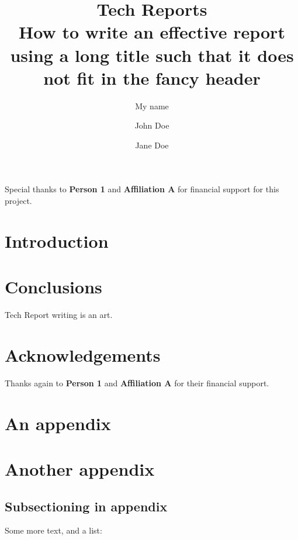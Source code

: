 \documentclass[12pt, letterpaper, twoside]{article}
\title{\textbf{Tech Reports\\How to write an effective report using a long title such that it does not fit in the fancy header}} %
\author{My name \and John Doe \and Jane Doe} %
\affiliation{My University} %
\begin{document}
\maketitle

\begin{abstract}
    \noindent
    \blindtext[1]

\end{abstract}

\vspace{2.5cm}

{\footnotesize
    \noindent
    Special thanks to \textbf{Person 1} and \textbf{Affiliation A} for financial support for this project.
}

\thispagestyle{firstpage}

\pagebreak


\newgeometry{} %

\section{Introduction}
\label{sec:intro}

\blindmathpaper

\section{Conclusions}
\label{sec:conc}

Tech Report writing is an art.

\section*{Acknowledgements}

Thanks again to \textbf{Person 1} and \textbf{Affiliation A} for their financial support.


% 
% 

\appendix

\section{An appendix}

\blindtext

\section{Another appendix}

\subsection*{Subsectioning in appendix}

Some more text, and a list:

\blindenumerate
\end{document}
